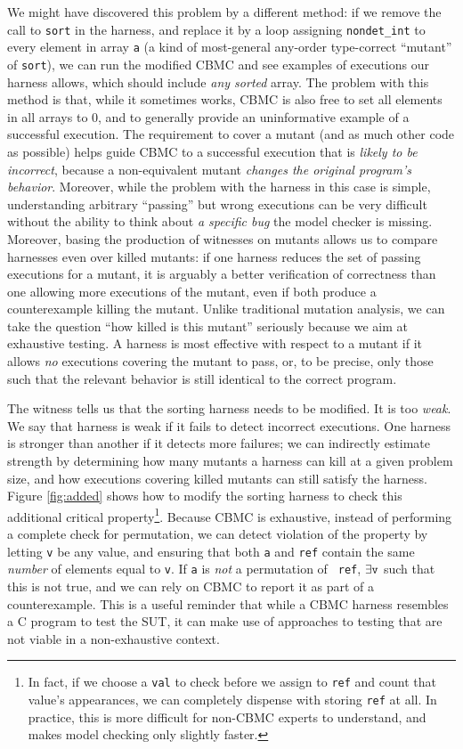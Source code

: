 \documentclass[conference]{IEEEtran}
\begin{document}
We might have discovered this problem by a different method: if we
remove the call to {\tt sort} in the harness, and replace it by a loop
assigning {\tt nondet\_int} to every element in array {\tt a} (a kind of
most-general any-order type-correct ``mutant'' of {\tt sort}), we can run
the modified CBMC and see examples of executions our harness allows,
which should include \emph{any sorted} array.  The problem with this
method is that, while it sometimes works, CBMC is also free to
set all elements in all arrays to 0, and to generally provide an
uninformative example of a successful execution.  The requirement to
cover a mutant (and as much other code as possible) helps guide CBMC
to a successful execution that is \emph{likely to be incorrect},
because a non-equivalent mutant \emph{changes the original program's behavior}.  Moreover, while the
problem with the harness in this case is simple, understanding
arbitrary ``passing'' but wrong executions can be very difficult
without the ability to think about \emph{a specific bug} the model
checker is missing.  Moreover, basing the production of witnesses on
mutants allows us to compare harnesses even over killed mutants:  if
one harness reduces the set of passing executions for a mutant, it is
arguably a better verification of correctness than one allowing more
executions of the mutant, even if both produce a counterexample
killing the mutant.  Unlike traditional mutation analysis, we can take
the question ``how killed is this mutant'' seriously because we aim at
exhaustive testing.  A harness is most effective with respect to a
mutant if it allows \emph{no} executions covering the mutant to pass,
or, to be precise, only those such that the relevant behavior is still identical
to the correct program.

The witness tells us that the sorting harness needs to be modified.
It is too \emph{weak}.  We say that harness is weak if it fails to
detect incorrect executions.  One harness is stronger than another if
it detects more failures; we can indirectly estimate strength by
determining how many mutants a harness can kill at a given problem
size, and how executions covering killed mutants can still satisfy the
harness.  Figure \ref{fig:added} shows how to modify the sorting
harness to check this additional critical property\footnote{In fact,
  if we choose a {\tt val} to check before we assign to {\tt ref} and
  count that value's appearances, we can completely dispense with
  storing {\tt ref} at all.  In practice, this is more difficult for
  non-CBMC experts to understand, and makes model checking only
  slightly faster.}.  Because CBMC is exhaustive, instead of
performing a complete check for permutation, we can detect violation
of the property by letting {\tt v} be any value, and ensuring that
both {\tt a} and {\tt ref} contain the same \emph{number} of elements
equal to {\tt v}.  If {\tt a} is \emph{not} a permutation of {\tt
  ref}, $\exists {\tt v}$ such that this is not true, and we can rely
on CBMC to report it as part of a counterexample.  This is a useful
reminder that while a CBMC harness resembles a C program to test the
SUT, it can make use of approaches to testing that are not viable in a
non-exhaustive context.
\end{document}
